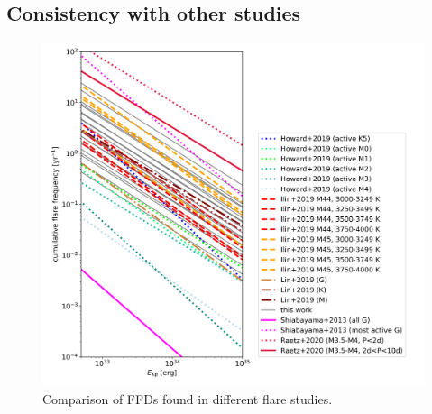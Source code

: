 \documentclass{aa}
\begin{document}
\subsection{Consistency with other studies}
\label{sec:consistency_other_work}
\begin{figure}
    \centering
    \includegraphics[width=13.5cm]{pics/FFDs/discussion_FFDs.png}
    \caption{Comparison of FFDs found in different flare studies. }          
    \label{fig:otherwork}
\end{figure}
\end{document}
